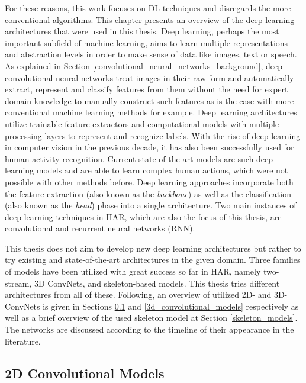 \documentclass[extern,palatino]{cgMA}
\begin{document}
\noindent For these reasons, this work focuses on DL techniques and disregards the more conventional algorithms. This chapter presents an overview of the deep learning architectures that were used in this thesis. Deep learning, perhaps the most important subfield of machine learning, aims to learn multiple representations and abstraction levels in order to make sense of data like images, text or speech. As explained in Section \ref{convolutional_neural_networks_background},  deep convolutional neural networks treat images in their raw form and automatically extract, represent and classify features from them without the need for expert domain knowledge to manually construct such features as is the case with more conventional machine learning methods for example. Deep learning architectures utilize trainable feature extractors and computational models with multiple processing layers to represent and recognize labels. With the rise of deep learning in computer vision in the previous decade, it has also been successfully used for human activity recognition. Current state-of-the-art models are such deep learning models and are able to learn complex human actions, which were not possible with other methods before. Deep learning approaches incorporate both the feature extraction (also known as the \textit{backbone}) as well as the classification (also known as the \textit{head}) phase into a single architecture. Two main instances of deep learning techniques in HAR, which are also the focus of this thesis, are convolutional and recurrent neural networks (RNN). 

\bigskip
\noindent This thesis does not aim to develop new deep learning architectures but rather to try existing and state-of-the-art architectures in the given domain. Three families of models have been utilized with great success so far in HAR, namely two-stream, 3D ConvNets, and skeleton-based models. This thesis tries different architectures from all of these. Following, an overview of utilized 2D- and 3D-ConvNets is given in Sections \ref{2d_convolutional_models} and \ref{3d_convolutional_models} respectively as well as a brief overview of the used skeleton model at Section \ref{skeleton_models}. The networks are discussed according to the timeline of their appearance in the literature.

\subsection{2D Convolutional Models}
\label{2d_convolutional_models}
\end{document}

